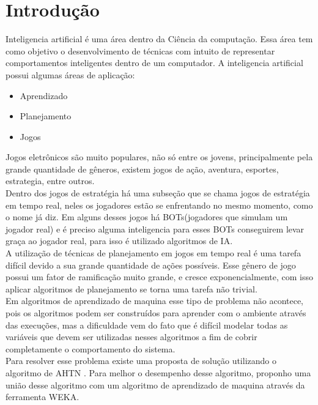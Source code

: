 \chapter{\label{chap:intro}Introdução}



Inteligencia artificial é uma área dentro da Ciência da computação. Essa área tem como objetivo o desenvolvimento de técnicas com intuito de representar comportamentos inteligentes dentro de um computador. A inteligencia artificial possui algumas áreas de aplicação: 
\begin{itemize}
	\item Aprendizado
	\item Planejamento
	\item Jogos
\end{itemize}

Jogos eletrônicos são muito populares, não só entre os jovens, principalmente pela grande quantidade de gêneros, existem jogos de ação, aventura, esportes, estrategia, entre outros. \\
Dentro dos jogos de estratégia há uma subseção que se chama jogos de estratégia em tempo real, neles os jogadores estão se enfrentando no mesmo momento, como o nome já diz. Em alguns desses jogos há BOTs(jogadores que simulam um jogador real) e é preciso alguma inteligencia para esses BOTs conseguirem levar graça ao jogador real, para isso é utilizado algoritmos de IA. \\
A utilização de técnicas de planejamento em jogos em tempo real é uma tarefa difícil devido a sua grande quantidade de ações possíveis. Esse gênero de jogo possui um fator de ramificação muito grande, e cresce exponencialmente, com isso aplicar algoritmos de planejamento se torna uma tarefa não trivial. \\
Em algoritmos de aprendizado de maquina esse tipo de problema não acontece, pois os algoritmos podem ser construídos para aprender com o ambiente através das execuções,  mas a dificuldade vem do fato que é difícil modelar todas as variáveis que devem ser utilizadas nesses algoritmos a fim de cobrir completamente o comportamento do sistema. \\
Para resolver esse problema existe uma proposta de solução utilizando o algoritmo de AHTN \cite{ontanon2015adversarial}. Para melhor o desempenho desse algoritmo, proponho uma união desse algoritmo com um algoritmo de aprendizado de maquina através da ferramenta WEKA. \\

